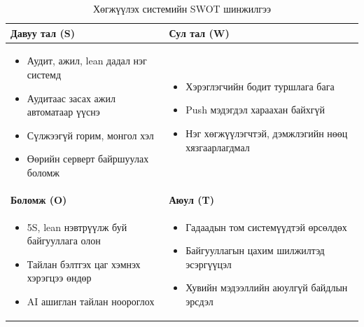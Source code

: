 \begin{table}[H]
\centering
\caption{Хөгжүүлэх системийн SWOT шинжилгээ}
\label{table:swot}
\begin{tabular}{|p{7cm}|p{7cm}|}
\hline
\textbf{Давуу тал (S)} & \textbf{Сул тал (W)} \\ \hline
\begin{itemize}[leftmargin=*,nosep]
\item Аудит, ажил, lean дадал нэг системд
\item Аудитаас засах ажил автоматаар үүснэ
\item Сүлжээгүй горим, монгол хэл
\item Өөрийн серверт байршуулах боломж
\end{itemize}
&
\begin{itemize}[leftmargin=*,nosep]
\item Хэрэглэгчийн бодит туршлага бага
\item Push мэдэгдэл хараахан байхгүй
\item Нэг хөгжүүлэгчтэй, дэмжлэгийн нөөц хязгаарлагдмал
\end{itemize}
\\ \hline
\textbf{Боломж (O)} & \textbf{Аюул (T)} \\ \hline
\begin{itemize}[leftmargin=*,nosep]
\item 5S, lean нэвтрүүлж буй байгууллага олон
\item Тайлан бэлтгэх цаг хэмнэх хэрэгцээ өндөр
\item AI ашиглан тайлан ноороглох
\end{itemize}
&
\begin{itemize}[leftmargin=*,nosep]
\item Гадаадын том системүүдтэй өрсөлдөх
\item Байгууллагын цахим шилжилтэд эсэргүүцэл
\item Хувийн мэдээллийн аюулгүй байдлын эрсдэл
\end{itemize}
\\ \hline
\end{tabular}
\end{table}

